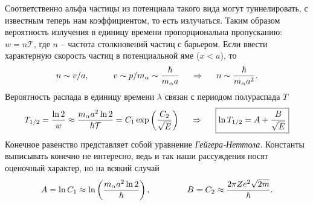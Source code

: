  Соответственно альфа частицы из потенциала такого вида могут туннелировать, с известным теперь нам коэффициентом, то есть излучаться. 
 Таким образом вероятность излучения в единицу времени пропорциональна пропусканию: $w = n \mathcal{T}$, где $n$ -- частота столкновений частиц с барьером.
 Если ввести характерную скорость частиц в потенциальной яме ($x<a$), то 
 \begin{equation*}
 	n \sim v / a,
 	\hspace{1 cm}
 	v \sim p/m_\alpha \sim \frac{\hbar}{m_\alpha a}
 	\hspace{0.5 cm}
 	\Rightarrow
 	\hspace{0.5 cm}
 	n \sim \frac{\hbar}{m_\alpha a^2}.
 \end{equation*}
 Вероятность распада в единицу времени $\lambda$ связан с периодом полураспада $T$
 \begin{equation*}
 	T_{1/2} = \frac{\ln 2}{w} \approx \frac{m_\alpha a^2 \ln 2}{\hbar \mathcal{T}} = C_1 \exp\left(\frac{C_2}{\sqrt{E}}\right)
 	\hspace{0.5 cm}
 	\Rightarrow
 	\hspace{0.5 cm}
 	\boxed{\ln T_{1/2} = A + \frac{B}{\sqrt{E}}}
 \end{equation*}
Конечное равенство представляет собой уравнение \textit{Гейгера-Неттола}. Константы выписывать конечно не интересно, ведь и так наши рассуждения носят оценочный характер, но на всякий случай
\begin{equation*}
	A = \ln C_1 \approx \ln \left(\frac{m_\alpha a^2 \ln 2}{\hbar}\right),
	\hspace{1.5 cm}
	B = C_2 \approx \frac{2 \pi Z e^2 \sqrt{2 m}}{\hbar}.
\end{equation*}